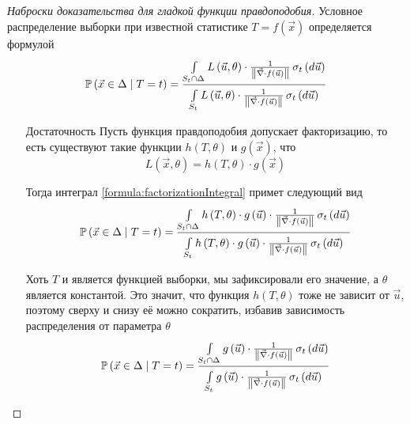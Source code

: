\begin{proof}[Наброски доказательства для гладкой функции правдоподобия]
    Условное распределение выборки при известной статистике
    $T=f\left( \vec{x} \right)$ определяется формулой
    \begin{equation}\label{formula:factorizationIntegral}
        \probability{\vec{x} \in \Delta \mcond T = t}
        = \frac{\integrall{S_t \cap \Delta}{\sigma_{t}\left(d\vec{u} \right)}{
            L\left( \vec{u}, \theta \right) \cdot \frac{1}{
                \left\| \vec{\nabla} \cdot f\left( \vec{u} \right) \right\|}}}
            {\integrall{S_t}{\sigma_{t}\left(d\vec{u} \right)}{
                L\left( \vec{u}, \theta \right) \cdot \frac{1}{
                    \left\| \vec{\nabla}
                        \cdot f\left( \vec{u} \right) \right\|}}}
    \end{equation}
    \begin{enumerate}
        \item[Достаточность]
            Пусть функция правдоподобия допускает факторизацию,
            то есть существуют такие функции $h\left( T, \theta \right)$
            и $g\left( \vec{x} \right)$, что
            $$L\left( \vec{x}, \theta \right)
                = h\left( T, \theta \right) \cdot g\left( \vec{x} \right)$$

            Тогда интеграл \eqref{formula:factorizationIntegral}
            примет следующий вид
            $$\probability{\vec{x} \in \Delta \mcond T = t}
                = \frac{\integrall{S_t \cap \Delta}{
                    \sigma_{t}\left(d\vec{u} \right)}{
                        h\left( T, \theta \right) \cdot g\left( \vec{u} \right)
                            \cdot \frac{1}{\left\| \vec{\nabla}
                                \cdot f\left( \vec{u} \right) \right\|}}}
                    {\integrall{S_t}{\sigma_{t}\left(d\vec{u} \right)}{
                        h\left( T, \theta \right) \cdot g\left( \vec{u} \right)
                            \cdot \frac{1}{\left\| \vec{\nabla}
                                \cdot f\left( \vec{u} \right) \right\|}}}$$

            Хоть $T$ и является функцией выборки, мы зафиксировали его значение,
            а $\theta$ является константой.
            Это значит, что функция $h\left( T, \theta \right)$ тоже не зависит
            от $\vec{u}$, поэтому сверху и снизу её можно сократить, избавив
            зависимость распределения от параметра $\theta$
            $$\probability{\vec{x} \in \Delta \mcond T = t}
                = \frac{\integrall{S_t \cap \Delta}{
                    \sigma_{t}\left(d\vec{u} \right)}{
                        g\left( \vec{u} \right)
                            \cdot \frac{1}{\left\| \vec{\nabla}
                                \cdot f\left( \vec{u} \right) \right\|}}}
                    {\integrall{S_t}{\sigma_{t}\left(d\vec{u} \right)}{
                        g\left( \vec{u} \right)
                            \cdot \frac{1}{\left\| \vec{\nabla}
                                \cdot f\left( \vec{u} \right) \right\|}}}$$


\end{enumerate}
\end{proof}
